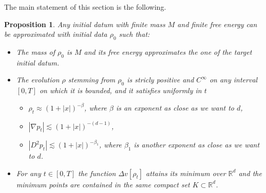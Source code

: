 \documentclass[11pt,a4paper]{article}
\numberwithin{equation}{section}
\newcommand{\R}{{\mathbb{R}}}
\theoremstyle{plain}
\newtheorem{proposition}[theorem]{Proposition}
\theoremstyle{remark}
\begin{document}
The main statement of this section is the following.

\begin{proposition}\label{prop:lipschitz-porous_main}
    Any initial datum with finite mass $M$ and finite free energy can be approximated with initial data $\rho_0$ such that:
    \begin{itemize}
        \item The mass of $\rho_0$ is $M$ and its free energy approximates the one of the target initial datum.
        \item The evolution $\rho$ stemming from $\rho_0$ is stricly positive and $C^\infty$ on any interval $[0,T]$ on which it is bounded, and it satisfies uniformly in $t$
        \begin{itemize}
            \item $\rho_t\approx (1+|x|)^{-\beta}$, where $\beta$ is an exponent as close as we want to $d$,
            \item $|\nabla p_t|\lesssim (1+|x|)^{-(d-1)}$,
            \item $|D^2 p_t|\lesssim (1+|x|)^{-\beta_1}$, where $\beta_1$ is another exponent as close as we want to $d$.
             \end{itemize}
    \item For any $t\in [0,T]$ the function $\Delta v[\rho_t]$ attains its minimum over $\R^d$ and the minimum points are contained in the same compact set $K\subset\R^d$.
    \end{itemize}
\end{proposition}
\end{document}
